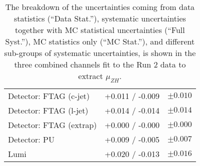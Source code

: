 \begin{table}[h]
\begin{tabular}{|l|c|c|}
Detector: FTAG (c-jet)   & +0.011 / -0.009 & $ \pm 0.010 $ \\
Detector: FTAG (l-jet)   & +0.014 / -0.014 & $ \pm 0.014 $ \\
Detector: FTAG (extrap)  & +0.000 / -0.000 & $ \pm 0.000 $ \\
Detector: PU             & +0.009 / -0.005 & $ \pm 0.007 $ \\
Lumi                     & +0.020 / -0.013 & $ \pm 0.016 $ \\
\hline\hline
\end{tabular}
\caption{The breakdown of the uncertainties coming from data statistics (``Data
  Stat.''), systematic uncertainties together with MC statistical uncertainties
  (``Full Syst.''), MC statistics only (``MC Stat.''), and different sub-groups
  of systematic uncertainties, is shown in the three combined channels fit to
  the Run 2 data to extract $\mu_{ZH}$.}
 \label{tab:breakdown_012L_MVAZH}
\end{table}